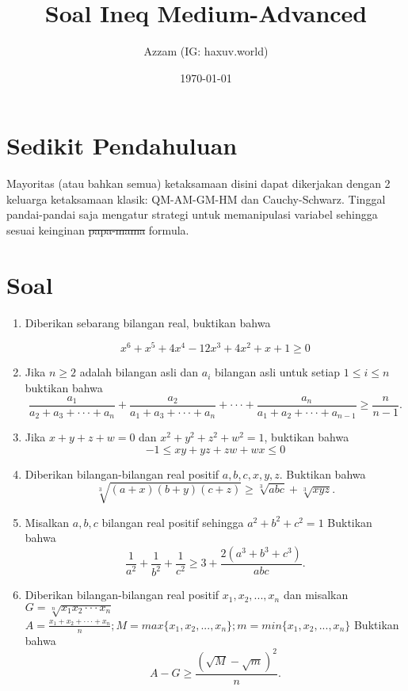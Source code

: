 \documentclass[11pt]{scrartcl}
\title{Soal Ineq Medium-Advanced}
\author{Azzam (IG: haxuv.world)}
\date{\today}
\begin{document}
\maketitle
\section{Sedikit Pendahuluan}
Mayoritas (atau bahkan semua) ketaksamaan disini dapat dikerjakan dengan 2 keluarga ketaksamaan klasik: QM-AM-GM-HM dan Cauchy-Schwarz. Tinggal pandai-pandai saja mengatur strategi untuk memanipulasi variabel sehingga sesuai keinginan \sout{papa-mama} formula.

\section{Soal}
\begin{enumerate}
\item Diberikan sebarang bilangan real, buktikan bahwa

\[x^{6}+x^{5}+4x^{4}-12x^{3}+4x^{2}+x+1\ge0\]

\item Jika \(n\ge2\) adalah bilangan asli dan \(a_{i}\) bilangan asli untuk setiap \(1\le i\le n\)
buktikan bahwa
\[\frac{a_{1}}{a_{2}+a_{3}+\cdot\cdot\cdot+a_{n}}+\frac{a_{2}}{a_{1}+a_{3}+\cdot\cdot\cdot+a_{n}}+\cdot\cdot\cdot+\frac{a_{n}}{a_{1}+a_{2}+\cdot\cdot\cdot+a_{n-1}}\ge\frac{n}{n-1}.\]

\item Jika $x + y + z + w = 0$ dan $x^2 + y^2 + z^2 + w^2 = 1$, buktikan bahwa
\[-1\le xy+yz+zw+wx\le0\]

\item Diberikan bilangan-bilangan real positif $a, b, c, x, y, z$. Buktikan bahwa
\[\sqrt[3]{(a+x)(b+y)(c+z)}\ge\sqrt[3]{abc}+\sqrt[3]{xyz}.\]

\item Misalkan $a, b, c $ bilangan real positif sehingga \(a^{2}+b^{2}+c^{2}=1\) Buktikan bahwa
\[\frac{1}{a^{2}}+\frac{1}{b^{2}}+\frac{1}{c^{2}}\ge3+\frac{2(a^{3}+b^{3}+c^{3})}{abc}.\]
\item Diberikan bilangan-bilangan real positif \(x_{1},x_{2},...,x_{n}\) dan misalkan \(G=\sqrt[n]{x_{1}x_{2}\cdot\cdot\cdot x_{n}}\) \\
\(A=\frac{x_{1}+x_{2}+\cdot\cdot\cdot+x_{n}}{n};M=max\{x_{1},x_{2},...,x_{n}\};m=min\{x_{1},x_{2},...,x_{n}\}\) Buktikan \\
bahwa \\
\[A-G\ge\frac{(\sqrt{M}-\sqrt{m})^{2}}{n}.\]


\end{enumerate}
\end{document}
